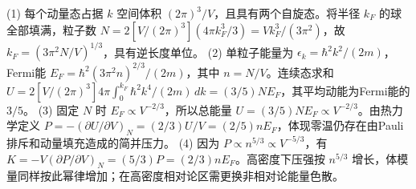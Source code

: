 (1) 每个动量态占据 \(k\) 空间体积 \((2\pi)^3/V\)，且具有两个自旋态。将半径 \(k_F\) 的球全部填满，粒子数 \(N=2[V/(2\pi)^3](4\pi k_F^3/3)=Vk_F^3/(3\pi^2)\)，故 \(k_F=(3\pi^2N/V)^{1/3}\)，具有逆长度单位。
(2) 单粒子能量为 \(\epsilon_k=\hbar^2k^2/(2m)\)，Fermi能 \(E_F=\hbar^2(3\pi^2n)^{2/3}/(2m)\)，其中 \(n=N/V\)。连续态求和 \(U=2[V/(2\pi)^3]4\pi\int_0^{k_F}\hbar^2k^4/(2m)\,dk=(3/5)NE_F\)，其平均动能为Fermi能的 \(3/5\)。
(3) 固定 \(N\) 时 \(E_F\propto V^{-2/3}\)，所以总能量 \(U=(3/5)NE_F\propto V^{-2/3}\)。由热力学定义 \(P=-(\partial U/\partial V)_N=(2/3)U/V=(2/5)nE_F\)，体现零温仍存在由Pauli排斥和动量填充造成的简并压力。
(4) 因为 \(P\propto n^{5/3}\propto V^{-5/3}\)，有 \(K=-V(\partial P/\partial V)_N=(5/3)P=(2/3)nE_F\)。高密度下压强按 \(n^{5/3}\) 增长，体模量同样按此幂律增加；在高密度相对论区需更换非相对论能量色散。
